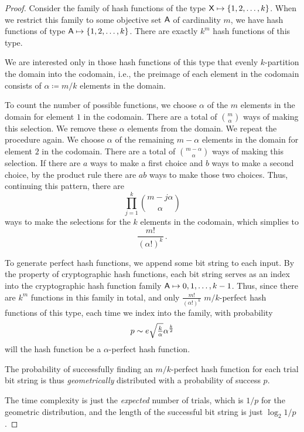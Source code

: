 \documentclass[ ../main.tex]{subfiles}
\begin{document}
\begin{proof}
    Consider the family of hash functions of the type $\Set{X} \mapsto \{1,2,\ldots,k\}$.
    When we restrict this family to some objective set $\Set{A}$ of cardinality $m$, we have hash functions of type $\Set{A} \mapsto \{1,2,\ldots,k\}$.
    There are exactly $k^m$ hash functions of this type.
    
    We are interested only in those hash functions of this type that evenly $k$-partition the domain into the codomain, i.e., the preimage of each element in the codomain consists of $\alpha \coloneqq m/k$ elements in the domain.
    
    To count the number of possible functions, we choose $\alpha$ of the $m$ elements in the domain for element $1$ in the codomain.
    There are a total of $m \choose \alpha$ ways of making this selection.
    We remove these $\alpha$ elements from the domain.
    We repeat the procedure again.
    We choose $\alpha$ of the remaining $m-\alpha$ elements in the domain for element $2$ in the codomain.
    There are a total of ${m-\alpha} \choose \alpha$ ways of making this selection.
    If there are $a$ ways to make a first choice and $b$ ways to make a second choice, by the product rule there are $a b$ ways to make those two choices.
    Thus, continuing this pattern, there are
    \begin{equation}
        \prod_{j=1}^{k} {{m - j \alpha} \choose \alpha}
    \end{equation}
    ways to make the selections for the $k$ elements in the codomain, which simplies to
    \begin{equation}
        \frac{m!}{(\alpha!)^k}\,.
    \end{equation}
    
    To generate perfect hash functions, we append some bit string to each input.
    By the property of cryptographic hash functions, each bit string serves as an index into the cryptographic hash function family $\Set{A} \mapsto {0,1,\ldots,k-1}$.
    Thus, since there are $k^m$ functions in this family in total, and only $\frac{m!}{(\alpha!)^k}$ $m/k$-perfect hash functions of this type, each time we index into the family, with probability
    \begin{equation}
        p \sim e \mathsmaller{\sqrt{\frac{k}{\alpha}}} \alpha^{\frac{k}{2}}
    \end{equation}
    will the hash function be a $\alpha$-perfect hash function.
    
    The probability of successfully finding an $m/k$-perfect hash function for each trial bit string is thus \emph{geometrically} distributed with a probability of success $p$.
    
    The time complexity is just the \emph{expected} number of trials, which is $1/p$ for the geometric distribution, and the length of the successful bit string is just $\log_2 1/p$.
\end{proof}
\end{document}
